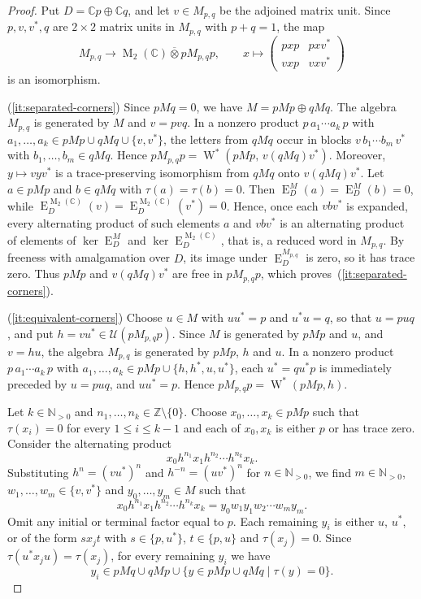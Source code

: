 \documentclass[11pt]{amsart}
\numberwithin{equation}{section}
\newcommand{\zz}{\mathbb Z}
\newcommand{\nn}{\mathbb N}
\newcommand{\cc}{\mathbb C}
\newcommand{\U}{\mathcal U}
\newcommand{\ovt}{\mathbin{\overline{\otimes}}}
\newcommand{\Wstar}{\operatorname{W}^*}
\newcommand{\rE}{\operatorname{E}}
\newcommand{\rM}{\operatorname{M}}
\theoremstyle{definition}
\begin{document}
\begin{proof}
    Put $D=\cc p\oplus\cc q$, and let $v\in M_{p,q}$ be the adjoined matrix unit. Since $p,v,v^*,q$ are $2\times2$ matrix units in $M_{p,q}$ with $p+q=1$, the map
    $$
        M_{p,q}\longrightarrow\rM_2(\cc)\ovt pM_{p,q}p,\qquad
        x\longmapsto\begin{pmatrix}pxp&pxv^*\\vxp&vxv^*\end{pmatrix}
    $$
    is an isomorphism.

    \textup{(\ref*{it:separated-corners})} Since $pMq=0$, we have $M=pMp\oplus qMq$. The algebra $M_{p,q}$ is generated by $M$ and $v=pvq$. In a nonzero product $p\,a_1\cdots a_k\,p$ with $a_1,\ldots,a_k\in pMp\cup qMq\cup\{v,v^*\}$, the letters from $qMq$ occur in blocks $v\,b_1\cdots b_m\,v^*$ with $b_1,\ldots,b_m\in qMq$. Hence $pM_{p,q}p=\Wstar(pMp,\,v(qMq)v^*)$. Moreover, $y\mapsto vyv^*$ is a trace-preserving isomorphism from $qMq$ onto $v(qMq)v^*$. Let $a\in pMp$ and $b\in qMq$ with $\tau(a)=\tau(b)=0$. Then $\rE_D^M(a)=\rE_D^M(b)=0$, while $\rE_D^{\rM_2(\cc)}(v)=\rE_D^{\rM_2(\cc)}(v^*)=0$. Hence, once each $vbv^*$ is expanded, every alternating product of such elements $a$ and $vbv^*$ is an alternating product of elements of $\ker\rE_D^M$ and $\ker\rE_D^{\rM_2(\cc)}$, that is, a reduced word in $M_{p,q}$. By freeness with amalgamation over $D$, its image under $\rE_D^{M_{p,q}}$ is zero, so it has trace zero. Thus $pMp$ and $v(qMq)v^*$ are free in $pM_{p,q}p$, which proves~\textup{(\ref*{it:separated-corners})}.

    \textup{(\ref*{it:equivalent-corners})} Choose $u\in M$ with $uu^*=p$ and $u^*u=q$, so that $u=puq$, and put $h=vu^*\in\U(pM_{p,q}p)$. Since $M$ is generated by $pMp$ and $u$, and $v=hu$, the algebra $M_{p,q}$ is generated by $pMp$, $h$ and $u$. In a nonzero product $p\,a_1\cdots a_k\,p$ with $a_1,\ldots,a_k\in pMp\cup\{h,h^*,u,u^*\}$, each $u^*=qu^*p$ is immediately preceded by $u=puq$, and $uu^*=p$. Hence $pM_{p,q}p=\Wstar(pMp,h)$. 
    
    Let $k\in\nn_{>0}$ and $n_1,\ldots,n_k\in\zz\setminus\{0\}$. Choose $x_0,\ldots,x_k\in pMp$ such that $\tau(x_i)=0$ for every $1\leq i\leq k-1$ and each of $x_0,x_k$ is either $p$ or has trace zero. Consider the alternating product
    $$x_0h^{n_1}x_1h^{n_2}\cdots h^{n_k}x_k.$$
    Substituting $h^n=(vu^*)^n$ and $h^{-n}=(uv^*)^n$ for $n\in\nn_{>0}$, we find $m\in\nn_{>0}$, $w_1,\ldots,w_m\in\{v,v^*\}$ and $y_0,\ldots,y_m\in M$ such that
    $$x_0h^{n_1}x_1h^{n_2}\cdots h^{n_k}x_k=y_0w_1y_1w_2\cdots w_my_m.$$
    Omit any initial or terminal factor equal to $p$. Each remaining $y_i$ is either $u$, $u^*$, or of the form $sx_jt$ with $s\in\{p,u^*\}$, $t\in\{p,u\}$ and $\tau(x_j)=0$. Since $\tau(u^*x_ju)=\tau(x_j)$, for every remaining $y_i$ we have
    $$y_i\in pMq\cup qMp\cup\{y\in pMp\cup qMq\mid\tau(y)=0\}.$$


\end{proof}
\end{document}
